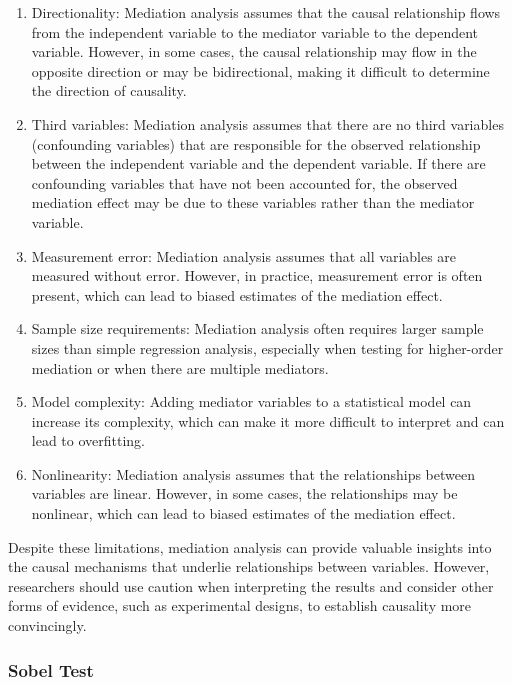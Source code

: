 \documentclass[
]{ctexart}
\begin{document}
\begin{enumerate}
\def\labelenumi{\arabic{enumi}.}
\item
  Directionality: Mediation analysis assumes that the causal
  relationship flows from the independent variable to the mediator
  variable to the dependent variable. However, in some cases, the causal
  relationship may flow in the opposite direction or may be
  bidirectional, making it difficult to determine the direction of
  causality.
\item
  Third variables: Mediation analysis assumes that there are no third
  variables (confounding variables) that are responsible for the
  observed relationship between the independent variable and the
  dependent variable. If there are confounding variables that have not
  been accounted for, the observed mediation effect may be due to these
  variables rather than the mediator variable.
\item
  Measurement error: Mediation analysis assumes that all variables are
  measured without error. However, in practice, measurement error is
  often present, which can lead to biased estimates of the mediation
  effect.
\item
  Sample size requirements: Mediation analysis often requires larger
  sample sizes than simple regression analysis, especially when testing
  for higher-order mediation or when there are multiple mediators.
\item
  Model complexity: Adding mediator variables to a statistical model can
  increase its complexity, which can make it more difficult to interpret
  and can lead to overfitting.
\item
  Nonlinearity: Mediation analysis assumes that the relationships
  between variables are linear. However, in some cases, the
  relationships may be nonlinear, which can lead to biased estimates of
  the mediation effect.
\end{enumerate}

Despite these limitations, mediation analysis can provide valuable
insights into the causal mechanisms that underlie relationships between
variables. However, researchers should use caution when interpreting the
results and consider other forms of evidence, such as experimental
designs, to establish causality more convincingly.

\hypertarget{sobel-test}{%
\subsubsection{Sobel Test}\label{sobel-test}}
\end{document}
